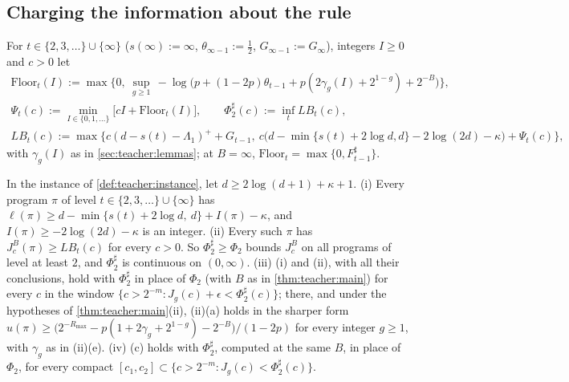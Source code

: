 \subsection{Charging the information about the rule}\label{app:teacher:rates}

For $t\in\{2,3,\dots\}\cup\{\infty\}$ ($s(\infty):=\infty$, $\theta_{\infty-1}:=\frac12$, $G_{\infty-1}:=G_\infty$), integers $I\ge0$ and $c>0$ let
\begin{gather*}
\mathrm{Floor}_t(I):=\max\Big\{0,\ \sup_{g\ge1}\,-\log\big(p+(1-2p)\theta_{t-1}+p(2\gamma_g(I)+2^{1-g})+2^{-B}\big)\Big\},\\
\Psi_t(c):=\min_{I\in\{0,1,\dots\}}\big[cI+\mathrm{Floor}_t(I)\big],\qquad\Phi_2^\sharp(c):=\inf_tLB_t(c),\\
LB_t(c):=\max\big\{c(d-s(t)-\Lambda_1)^++G_{t-1},\ c\big(d-\min\{s(t)+2\log d,d\}-2\log(2d)-\kappa\big)+\Psi_t(c)\big\},
\end{gather*}
with $\gamma_g(I)$ as in \cref{sec:teacher:lemmas}; at $B=\infty$, $\mathrm{Floor}_t=\max\{0,F^\sharp_{t-1}\}$.

\begin{proposition}\label{prop:teacher:sharp}
In the instance of \cref{def:teacher:instance}, let $d\ge2\log(d+1)+\kappa+1$.
(i) Every program $\pi$ of level $t\in\{2,3,\dots\}\cup\{\infty\}$ has $\ell(\pi)\ge d-\min\{s(t)+2\log d,\ d\}+I(\pi)-\kappa$, and $I(\pi)\ge-2\log(2d)-\kappa$ is an integer.
(ii) Every such $\pi$ has $J^B_c(\pi)\ge LB_t(c)$ for every $c>0$. So $\Phi_2^\sharp\ge\Phi_2$ bounds $J^B_c$ on all programs of level at least $2$, and $\Phi_2^\sharp$ is continuous on $(0,\infty)$.
(iii) (i) and (ii), with all their conclusions, hold with $\Phi_2^\sharp$ in place of $\Phi_2$ (with $B$ as in \cref{thm:teacher:main}) for every $c$ in the window $\{c>2^{-m}:J_g(c)+\epsilon<\Phi_2^\sharp(c)\}$; there, and under the hypotheses of \cref{thm:teacher:main}(ii), (ii)(a) holds in the sharper form $u(\pi)\ge\big(2^{-R_{\max}}-p(1+2\gamma_g+2^{1-g})-2^{-B}\big)/(1-2p)$ for every integer $g\ge1$, with $\gamma_g$ as in (ii)(e).
(iv) (c) holds with $\Phi_2^\sharp$, computed at the same $B$, in place of $\Phi_2$, for every compact $[c_1,c_2]\subset\{c>2^{-m}:J_g(c)<\Phi_2^\sharp(c)\}$.
\end{proposition}

